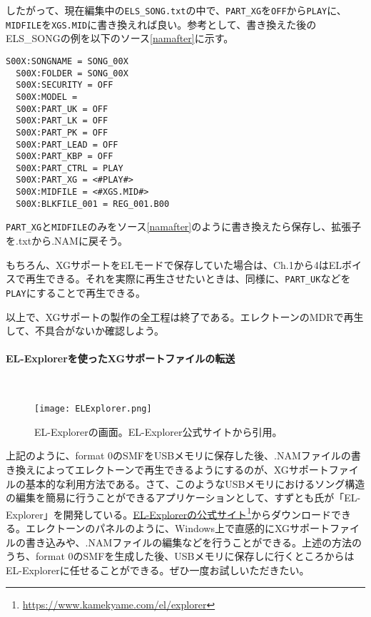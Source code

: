 \documentclass[uplatex, 10pt, dvipdfmx]{jsarticle}
\numberwithin{equation}{section}
\begin{document}
したがって、現在編集中の\texttt{ELS_SONG.txt}の中で、\texttt{PART_XG}を\texttt{OFF}から\texttt{PLAY}に、\texttt{MIDFILE}を\texttt{XGS.MID}に書き換えれば良い。参考として、書き換えた後のELS\_SONGの例を以下のソース\ref{namafter}に示す。

\begin{lstlisting}[caption=ELS\_SONG.NAM（変更後）,label=namafter]
  S00X:SONGNAME = SONG_00X 
  S00X:FOLDER = SONG_00X 
  S00X:SECURITY = OFF 
  S00X:MODEL =  
  S00X:PART_UK = OFF 
  S00X:PART_LK = OFF 
  S00X:PART_PK = OFF 
  S00X:PART_LEAD = OFF 
  S00X:PART_KBP = OFF 
  S00X:PART_CTRL = PLAY 
  S00X:PART_XG = <#PLAY#>
  S00X:MIDFILE = <#XGS.MID#>
  S00X:BLKFILE_001 = REG_001.B00 
\end{lstlisting}

\texttt{PART_XG}と\texttt{MIDFILE}のみをソース\ref{namafter}のように書き換えたら保存し、拡張子を.txtから.NAMに戻そう。

もちろん、XGサポートをELモードで保存していた場合は、Ch.1から4はELボイスで再生できる。それを実際に再生させたいときは、同様に、\texttt{PART_UK}などを\texttt{PLAY}にすることで再生できる。

以上で、XGサポートの製作の全工程は終了である。エレクトーンのMDRで再生して、不具合がないか確認しよう。

\clearpage
\paragraph{EL-Explorerを使ったXGサポートファイルの転送}\

\begin{wrapfigure}{r}[5mm]{70mm}
  \centering
  \texttt{[image: ELExplorer.png]}
  \caption{EL-Explorerの画面。EL-Explorer公式サイトから引用。}
  \label{figELexplorer}
\end{wrapfigure}
上記のように、format 0のSMFをUSBメモリに保存した後、.NAMファイルの書き換えによってエレクトーンで再生できるようにするのが、XGサポートファイルの基本的な利用方法である。さて、このようなUSBメモリにおけるソング構造の編集を簡易に行うことができるアプリケーションとして、すずとも氏が「EL-Explorer」を開発している。\href{https://www.kamekyame.com/el/explorer}{EL-Explorerの公式サイト}\footnote{\url{https://www.kamekyame.com/el/explorer}}からダウンロードできる。エレクトーンのパネルのように、Windows上で直感的にXGサポートファイルの書き込みや、.NAMファイルの編集などを行うことができる。上述の方法のうち、format 0のSMFを生成した後、USBメモリに保存しに行くところからはEL-Explorerに任せることができる。ぜひ一度お試しいただきたい。
\end{document}
